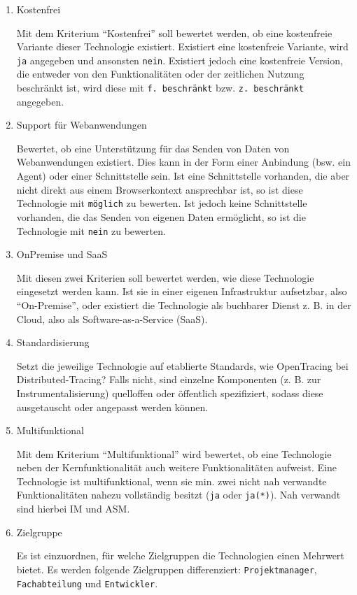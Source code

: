 \begin{enumerate}
	\item Kostenfrei
	\par Mit dem Kriterium \enquote{Kostenfrei} soll bewertet werden, ob eine kostenfreie Variante dieser Technologie existiert. Existiert eine kostenfreie Variante, wird \texttt{ja} angegeben und ansonsten \texttt{nein}. Existiert jedoch eine kostenfreie Version, die entweder von den Funktionalitäten oder der zeitlichen Nutzung beschränkt ist, wird diese mit \texttt{f. beschränkt} bzw. \texttt{z. beschränkt} angegeben.

	\item Support für Webanwendungen
	\par Bewertet, ob eine Unterstützung für das Senden von Daten von Webanwendungen existiert. Dies kann in der Form einer Anbindung (bsw. ein Agent\footnotemark{}) oder einer Schnittstelle sein. Ist eine Schnittstelle vorhanden, die aber nicht direkt aus einem Browserkontext ansprechbar ist, so ist diese Technologie mit \texttt{möglich} zu bewerten. Ist jedoch keine Schnittstelle vorhanden, die das Senden von eigenen Daten ermöglicht, so ist die Technologie mit \texttt{nein} zu bewerten.

	\item OnPremise und SaaS
	\par Mit diesen zwei Kriterien soll bewertet werden, wie diese Technologie eingesetzt werden kann. Ist sie in einer eigenen Infrastruktur aufsetzbar, also \enquote{On-Premise}, oder existiert die Technologie als buchbarer Dienst z. B. in der Cloud, also als Software-as-a-Service (SaaS).

	\item Standardisierung
	\par Setzt die jeweilige Technologie auf etablierte Standards, wie OpenTracing bei Distributed-Tracing? Falls nicht, sind einzelne Komponenten (z. B. zur Instrumentalisierung) quelloffen oder öffentlich spezifiziert, sodass diese ausgetauscht oder angepasst werden können.

	\item Multifunktional
	\par Mit dem Kriterium \enquote{Multifunktional} wird bewertet, ob eine Technologie neben der Kernfunktionalität auch weitere Funktionalitäten aufweist. Eine Technologie ist multifunktional, wenn sie min. zwei nicht nah verwandte Funktionalitäten nahezu vollständig besitzt (\texttt{ja} oder \texttt{ja(*)}). Nah verwandt sind hierbei IM und ASM.

	\item Zielgruppe
	\par Es ist einzuordnen, für welche Zielgruppen die Technologien einen Mehrwert bietet. Es werden folgende Zielgruppen differenziert: \texttt{Projektmanager}, \texttt{Fachabteilung} und \texttt{Entwickler}.
	
\end{enumerate}

